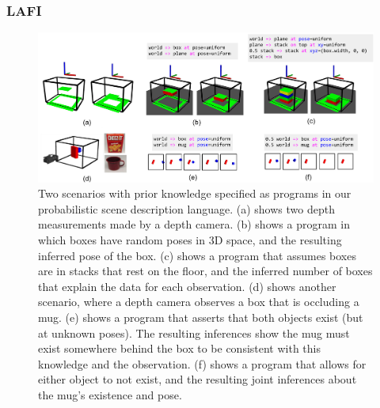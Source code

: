 
    \subsubsection{LAFI}

      \begin{figure}[t]
          \centering
          \includegraphics[width=\textwidth]{figures/lafi-fig.pdf}
          \caption{\small
            Two scenarios with prior knowledge specified as programs in our probabilistic scene description language.
            (a) shows two depth measurements made by a depth camera.
            (b) shows a program in which boxes have random poses in 3D space, and the resulting inferred pose of the box.
            (c) shows a program that assumes boxes are in stacks that rest on the floor, and the inferred number of boxes that explain the data for each observation.
            (d) shows another scenario, where a depth camera observes a box that is occluding a mug.
            (e) shows a program that asserts that both objects exist (but at unknown poses).
            The resulting inferences show the mug must exist somewhere behind the box to be consistent with this knowledge and the observation.
            (f) shows a program that allows for either object to not exist, and the resulting joint inferences about the mug's existence and pose.
            }
          \label{fig:results}
      \end{figure}
